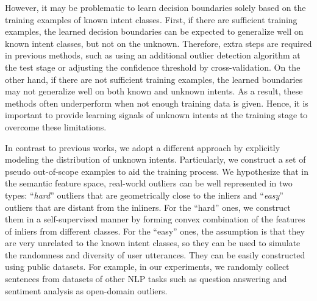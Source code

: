 However, it may be problematic to learn decision boundaries solely based on the training examples of known intent classes. First, if there are sufficient training examples, the learned decision boundaries can be expected to generalize well on known intent classes, but not on the unknown. Therefore, extra steps are required in previous methods, such as using an additional outlier detection algorithm at the test stage or adjusting the confidence threshold by cross-validation. On the other hand, if there are not sufficient training examples, the learned boundaries may not generalize well on both known and unknown intents. As a result, these methods often underperform when not enough training data is given. Hence, it is important to provide learning signals of unknown intents at the training stage to overcome these limitations.



In contrast to previous works, we adopt a different approach by explicitly modeling the distribution of unknown intents. Particularly, we construct a set of pseudo out-of-scope examples to aid the training process. We hypothesize that in the semantic feature space, real-world outliers can be well represented in two types: ``\emph{hard}'' outliers that are geometrically close to the inliers and ``\emph{easy}'' outliers that are distant from the inliners. For the ``hard'' ones, we construct them in a self-supervised manner by forming convex combination of the features of inliers from different classes. 
For the ``easy'' ones, the assumption is that they are very unrelated to the known intent classes, so they can be used to simulate the randomness and diversity of user utterances. They can be easily constructed using public datasets. For example, in our experiments, we randomly collect sentences from datasets of other NLP tasks such as question answering and sentiment analysis as open-domain outliers. 

